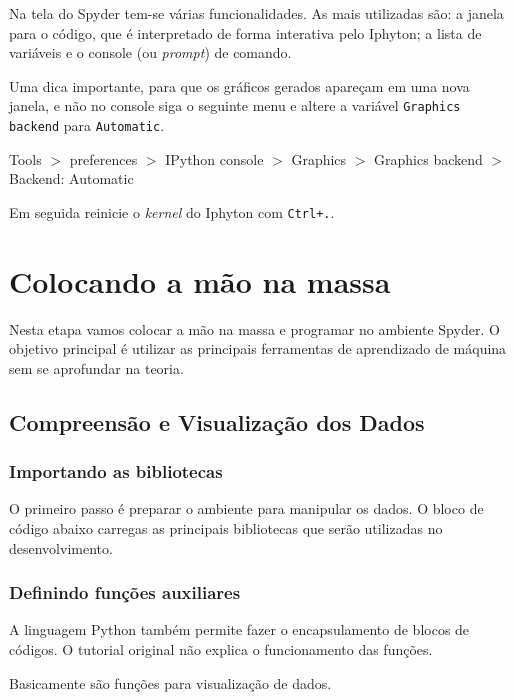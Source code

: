 \documentclass[a4paper,12pt]{report}
\begin{document}
Na tela do Spyder tem-se várias funcionalidades.  As mais utilizadas são: a janela para o código, que é interpretado de forma interativa pelo Iphyton; a lista de variáveis e o console (ou \textit{prompt}) de comando.

Uma dica importante, para que os gráficos gerados apareçam em uma nova janela, e não no console siga o seguinte menu e altere a variável \texttt{Graphics backend} para \texttt{Automatic}.

Tools $>$ preferences $>$ IPython console $>$ Graphics $>$ Graphics backend $>$ Backend: Automatic

Em seguida reinicie o \textit{kernel} do Iphyton com \texttt{Ctrl+.}.

\chapter{Colocando a mão na massa}

Nesta etapa vamos colocar a mão na massa e programar no ambiente Spyder. O objetivo principal é utilizar as principais ferramentas de aprendizado de máquina sem se aprofundar na teoria.

\section{Compreensão e Visualização dos Dados}



\subsection{Importando as bibliotecas}

O primeiro passo é preparar o ambiente para manipular os dados. O bloco de código abaixo carregas as principais bibliotecas que serão utilizadas no desenvolvimento.\\



	
\subsection{Definindo funções auxiliares}

A linguagem Python também permite fazer o encapsulamento de blocos de códigos. O tutorial original não explica o funcionamento das funções. 

Basicamente são funções para visualização de dados.\\
\end{document}
